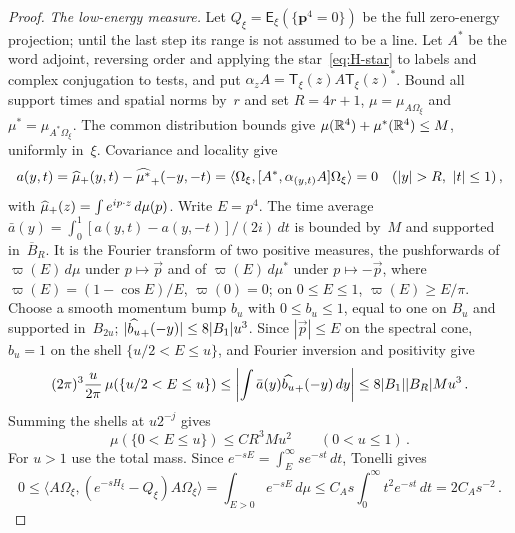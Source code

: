 \begin{proof}
\emph{The low-energy measure.} Let $Q_\xi=\mathsf E_\xi(\{\mathbf p^4=0\})$ be the full zero-energy projection; until the last step its range is not assumed to be a line. Let $A^*$ be the word adjoint, reversing order and applying the star~\eqref{eq:H-star} to labels and complex conjugation to tests, and put $\alpha_zA=\mathsf T_\xi(z)A\mathsf T_\xi(z)^*$. Bound all support times and spatial norms by~$r$ and set $R=4r+1$, $\mu=\mu_{A\Omega_\xi}$ and $\mu^*=\mu_{A^*\Omega_\xi}$. The common distribution bounds give $\mu(\mathbb{R}^4)+\mu^*(\mathbb{R}^4)\le M$, uniformly in~$\xi$. Covariance and locality give
\begin{equation*}
a(y,t)=\fourierplus{\mu}(y,t)-\fourierplus{\mu^*}(-y,-t)
=\langle\Omega_\xi,[A^*,\alpha_{(y,t)}A]\Omega_\xi\rangle=0
\quad(|y|>R,\ |t|\le1)\,,
\end{equation*}
with $\widehat{\mu}_{+}(z)=\int e^{ip\cdot z}\,d\mu(p)$. Write $E=p^4$. The time average $\bar a(y)=\int_0^1[a(y,t)-a(y,-t)]/(2i)\,dt$ is bounded by~$M$ and supported in~$\overline B_R$. It is the Fourier transform of two positive measures, the pushforwards of $\varpi(E)\,d\mu$ under $p\mapsto\vec p$ and of $\varpi(E)\,d\mu^*$ under $p\mapsto-\vec p$, where $\varpi(E)=(1-\cos E)/E$, $\varpi(0)=0$; on $0\le E\le1$, $\varpi(E)\ge E/\pi$. Choose a smooth momentum bump $b_u$ with $0\le b_u\le1$, equal to one on $B_u$ and supported in~$B_{2u}$; $|\widehat{b_u}_{+}(-y)|\le8|B_1|u^3$. Since $|\vec p|\le E$ on the spectral cone, $b_u=1$ on the shell $\{u/2<E\le u\}$, and Fourier inversion and positivity give
\begin{equation*}
(2\pi)^3\frac{u}{2\pi}\,\mu(\{u/2<E\le u\})
\le\left|\int\bar a(y)\widehat{b_u}_{+}(-y)\,dy\right|
\le8|B_1||B_R|M u^3\,.
\end{equation*}
Summing the shells at $u2^{-j}$ gives
\begin{equation}\label{eq:H-low}
\mu(\{0<E\le u\})\le C R^3M u^2\qquad(0<u\le1)\,.
\end{equation}
For $u>1$ use the total mass. Since $e^{-sE}=\int_E^\infty se^{-st}\,dt$, Tonelli gives
\begin{equation}\label{eq:H-heat}
0\le\langle A\Omega_\xi,(e^{-sH_\xi}-Q_\xi)A\Omega_\xi\rangle
=\int_{E>0}e^{-sE}\,d\mu
\le C_A s\int_0^\infty t^2e^{-st}\,dt=2C_As^{-2}\,.
\end{equation}


\end{proof}
